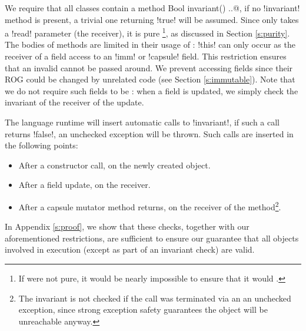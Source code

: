 

We require that all classes contain a \Q@read method Bool invariant() {..}@, if no \Q!invariant! method is present, a trivial one returning \Q!true! will be assumed. Since \Q@invariant@ only takes a \Q!read! parameter (the receiver), it is pure \footnote{If \Q@invariant@ were not pure, it would be nearly impossible to ensure that it would  \Q@true@.}, as discussed in Section \ref{s:purity}.
The bodies of \Q@invariant@ methods are limited in their usage of \Q@this@: \Q!this! can only occur as the receiver of a field access to an \Q!imm! or \Q!capsule! field. This restriction ensures that 
an invalid \Q@this@ cannot be passed around.
We prevent accessing \Q@mut@ fields since their ROG could be changed by unrelated code (see Section \ref{s:immutable}).
Note that we do not require such fields to be \Q@final@: when a field is updated, we simply check the invariant of the receiver of the update.

The language runtime will insert automatic calls to \Q!invariant!, if such a call returns \Q!false!, an unchecked exception will be thrown. Such calls are inserted in the following points:
\begin{itemize}
	\item After a constructor call, on the newly created object.
	\item After a field update, on the receiver.
	\item After a capsule mutator method returns, on the receiver of the method\footnote{The invariant is not checked if the call was terminated via an an unchecked exception, since strong exception safety guarantees the object will be unreachable anyway.}.
\end{itemize}
\noindent In Appendix \ref{s:proof}, we show that these checks, together with our aforementioned restrictions, are sufficient to ensure our guarantee that all objects involved in execution (except as part of an invariant check) are valid.

